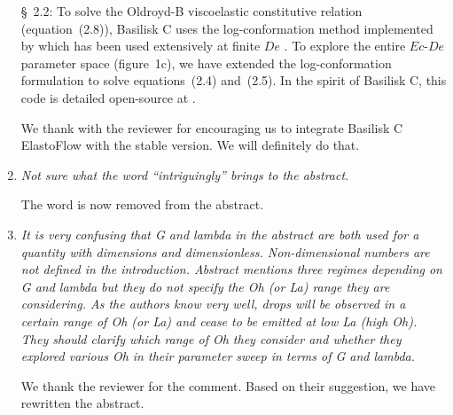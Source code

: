 \documentclass[]{article}
\newcommand{\oo}{\color{magenta} \normalfont}
\newcommand{\bb}{\color{black} \normalfont}
\begin{document}
\begin{enumerate}
      \S~2.2: \oo
      To solve the Oldroyd-B viscoelastic constitutive relation (equation~(2.8)), Basilisk C uses the log-conformation method \citep{fattal2004constitutive} implemented by \citet{lopez2019adaptive} which has been used extensively at finite $De$ \citep{turkoz2018axisymmetric, turkoz2021simulation}. To explore the entire $Ec$-$De$ parameter space  (figure~1c), we have extended the log-conformation formulation to solve equations~(2.4) and~(2.5). In the spirit of Basilisk C, this code is detailed open-source at \citet{vatsalElastoFlow2024}.\bb\,

      We thank with the reviewer for encouraging us to integrate Basilisk C ElastoFlow \citep{vatsalElastoFlow2024} with the stable version. We will definitely do that.

      \item \textit{Not sure what the word “intriguingly” brings to the abstract.}

       The word is now removed from the abstract.

      \item \textit{It is very confusing that G and lambda in the abstract are both used for a quantity with dimensions and dimensionless. Non-dimensional numbers are not defined in the introduction. Abstract mentions three regimes depending on G and lambda but they do not specify the Oh (or La) range they are considering. As the authors know very well, drops will be observed in a certain range of Oh (or La) and cease to be emitted at low La (high Oh). They should clarify which range of Oh they consider and whether they explored various Oh in their parameter sweep in terms of G and lambda.}

	  We thank the reviewer for the comment. Based on their suggestion, we have rewritten the abstract.


\end{enumerate}
\end{document}

